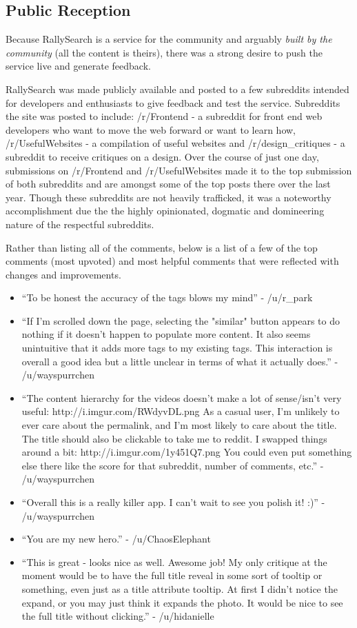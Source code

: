 \documentclass[msc,oneside]{ubcthesis}%
\begin{document}
\subsection{Public Reception}
Because RallySearch is a service for the community and arguably \textit{built by the community} (all the content is theirs), there was a strong desire to push the service live and generate feedback.
\par
RallySearch was made publicly available and posted to a few subreddits intended for developers and enthusiasts to give feedback and test the service. Subreddits the site was posted to include: /r/Frontend - a subreddit for front end web developers who want to move the web forward or want to learn how, /r/UsefulWebsites - a compilation of useful websites and /r/design\_critiques - a subreddit to receive critiques on a design. Over the course of just one day, submissions on /r/Frontend and /r/UsefulWebsites made it to the top submission of both subreddits and are amongst some of the top posts there over the last year. Though these subreddits are not heavily trafficked, it was a noteworthy accomplishment due the the highly opinionated, dogmatic and domineering nature of the respectful subreddits.
\par
Rather than listing all of the comments, below is a list of a few of the top comments (most upvoted) and most helpful comments that were reflected with changes and improvements.
\begin{itemize}
\item{``To be honest the accuracy of the tags blows my mind'' - /u/r\_park}
\item{``If I'm scrolled down the page, selecting the "similar" button appears to do nothing if it doesn't happen to populate more content. It also seems unintuitive that it adds more tags to my existing tags. This interaction is overall a good idea but a little unclear in terms of what it actually does.'' - /u/wayspurrchen}
\item{``The content hierarchy for the videos doesn't make a lot of sense/isn't very useful: http://i.imgur.com/RWdyvDL.png As a casual user, I'm unlikely to ever care about the permalink, and I'm most likely to care about the title. The title should also be clickable to take me to reddit. I swapped things around a bit: http://i.imgur.com/1y451Q7.png You could even put something else there like the score for that subreddit, number of comments, etc.'' - /u/wayspurrchen}
\item{``Overall this is a really killer app. I can't wait to see you polish it! :)'' - /u/wayspurrchen}
\item{``You are my new hero.'' - /u/ChaosElephant}
\item{``This is great - looks nice as well. Awesome job!
My only critique at the moment would be to have the full title reveal in some sort of tooltip or something, even just as a title attribute tooltip. At first I didn't notice the expand, or you may just think it expands the photo. It would be nice to see the full title without clicking.'' - /u/hidanielle}
\end{itemize}
\end{document}
